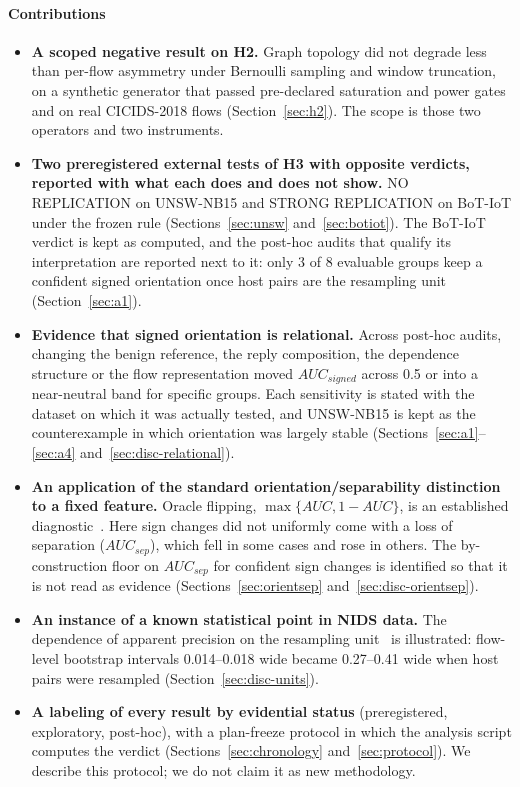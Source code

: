 \documentclass[preprint,12pt]{elsarticle}
\begin{document}
\paragraph{Contributions}
\begin{itemize}
\item \textbf{A scoped negative result on H2.} Graph topology did not degrade less than per-flow asymmetry under Bernoulli sampling and window truncation, on a synthetic generator that passed pre-declared saturation and power gates and on real CICIDS-2018 flows (Section~\ref{sec:h2}). The scope is those two operators and two instruments.
\item \textbf{Two preregistered external tests of H3 with opposite verdicts, reported with what each does and does not show.} NO REPLICATION on UNSW-NB15 and STRONG REPLICATION on BoT-IoT under the frozen rule (Sections~\ref{sec:unsw} and~\ref{sec:botiot}). The BoT-IoT verdict is kept as computed, and the post-hoc audits that qualify its interpretation are reported next to it: only 3 of 8 evaluable groups keep a confident signed orientation once host pairs are the resampling unit (Section~\ref{sec:a1}).
\item \textbf{Evidence that signed orientation is relational.} Across post-hoc audits, changing the benign reference, the reply composition, the dependence structure or the flow representation moved $AUC_{signed}$ across 0.5 or into a near-neutral band for specific groups. Each sensitivity is stated with the dataset on which it was actually tested, and UNSW-NB15 is kept as the counterexample in which orientation was largely stable (Sections~\ref{sec:a1}--\ref{sec:a4} and~\ref{sec:disc-relational}).
\item \textbf{An application of the standard orientation/separability distinction to a fixed feature.} Oracle flipping, $\max\{AUC,1-AUC\}$, is an established diagnostic~\cite{jin2026benchmark}. Here sign changes did not uniformly come with a loss of separation ($AUC_{sep}$), which fell in some cases and rose in others. The by-construction floor on $AUC_{sep}$ for confident sign changes is identified so that it is not read as evidence (Sections~\ref{sec:orientsep} and~\ref{sec:disc-orientsep}).
\item \textbf{An instance of a known statistical point in NIDS data.} The dependence of apparent precision on the resampling unit~\cite{fieldwelsh2007,cameron2008bootstrap} is illustrated: flow-level bootstrap intervals 0.014--0.018 wide became 0.27--0.41 wide when host pairs were resampled (Section~\ref{sec:disc-units}).
\item \textbf{A labeling of every result by evidential status} (preregistered, exploratory, post-hoc), with a plan-freeze protocol in which the analysis script computes the verdict (Sections~\ref{sec:chronology} and~\ref{sec:protocol}). We describe this protocol; we do not claim it as new methodology.
\end{itemize}
\end{document}
